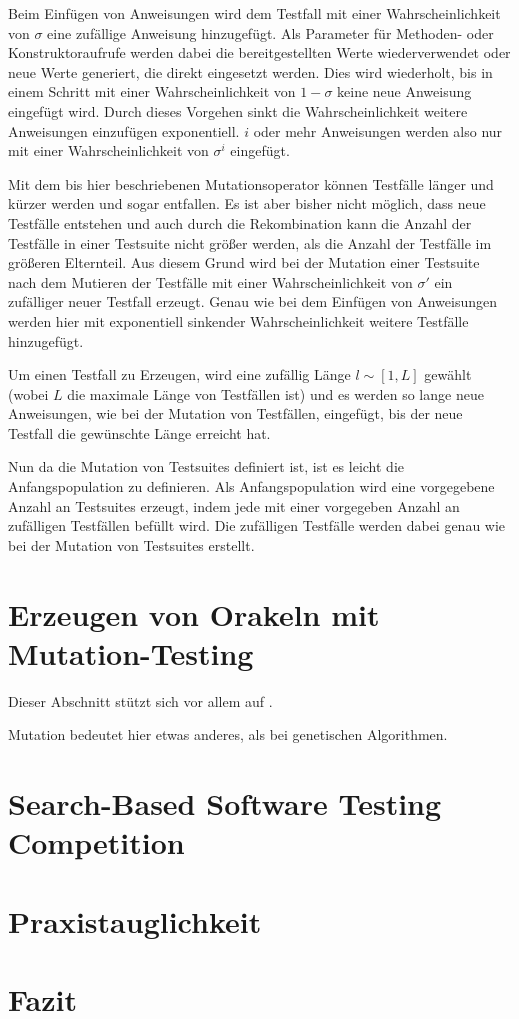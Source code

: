 \documentclass[a4paper,11pt]{article}
\begin{document}
Beim Einfügen von Anweisungen wird dem Testfall mit einer Wahrscheinlichkeit von $\sigma$ eine zufällige Anweisung hinzugefügt.
Als Parameter für Methoden- oder Konstruktoraufrufe werden dabei die bereitgestellten Werte wiederverwendet oder neue Werte generiert, die direkt eingesetzt werden.
Dies wird wiederholt, bis in einem Schritt mit einer Wahrscheinlichkeit von $1 - \sigma$ keine neue Anweisung eingefügt wird.
Durch dieses Vorgehen sinkt die Wahrscheinlichkeit weitere Anweisungen einzufügen exponentiell.
$i$ oder mehr Anweisungen werden also nur mit einer Wahrscheinlichkeit von $\sigma^i$ eingefügt.

Mit dem bis hier beschriebenen Mutationsoperator können Testfälle länger und kürzer werden und sogar entfallen.
Es ist aber bisher nicht möglich, dass neue Testfälle entstehen und auch durch die Rekombination kann die Anzahl der Testfälle in einer Testsuite nicht größer werden, als die Anzahl der Testfälle im größeren Elternteil.
Aus diesem Grund wird bei der Mutation einer Testsuite nach dem Mutieren der Testfälle mit einer Wahrscheinlichkeit von $\sigma'$ ein zufälliger neuer Testfall erzeugt.
Genau wie bei dem Einfügen von Anweisungen werden hier mit exponentiell sinkender Wahrscheinlichkeit weitere Testfälle hinzugefügt.

Um einen Testfall zu Erzeugen, wird eine zufällig Länge $l \sim [1, L]$ gewählt (wobei $L$ die maximale Länge von Testfällen ist) und es werden so lange neue Anweisungen, wie bei der Mutation von Testfällen, eingefügt, bis der neue Testfall die gewünschte Länge erreicht hat.

Nun da die Mutation von Testsuites definiert ist, ist es leicht die Anfangspopulation zu definieren.
Als Anfangspopulation wird eine vorgegebene Anzahl an Testsuites erzeugt, indem jede mit einer vorgegeben Anzahl an zufälligen Testfällen befüllt wird.
Die zufälligen Testfälle werden dabei genau wie bei der Mutation von Testsuites erstellt.

\section{Erzeugen von Orakeln mit Mutation-Testing}

Dieser Abschnitt stützt sich vor allem auf \cite{TSE12_Mutation}.

Mutation bedeutet hier etwas anderes, als bei genetischen Algorithmen.

\section{Search-Based Software Testing Competition}

\section{Praxistauglichkeit}

\section{Fazit}



\end{document}
